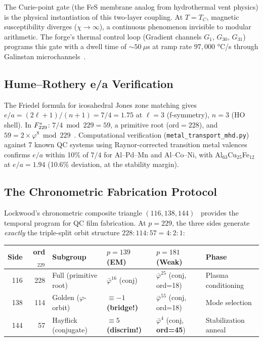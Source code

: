 The Curie-point gate (the FeS membrane analog from hydrothermal vent physics) is the physical instantiation of this two-layer coupling. At $T = T_C$, magnetic susceptibility diverges ($\chi \to \infty$), a continuous phenomenon invisible to modular arithmetic. The forge's thermal control loop (Gradient channels $G_1$, $G_{30}$, $G_{31}$) programs this gate with a dwell time of $\sim 50~\mu$s at ramp rate $97{,}000$ °C/s through Galinstan microchannels~\cite{lockwood_gmf34}.

\subsection{Hume--Rothery e/a Verification}

The Friedel formula for icosahedral Jones zone matching gives $e/a = (2\ell+1)/(n+1) = 7/4 = 1.75$ at $\ell = 3$ (f-symmetry), $n = 3$ (HO shell). In $F_{229}^*$: $7/4 \bmod 229 = 59$, a primitive root ($\mathrm{ord} = 228$), and $59 = 2 \times \varphi^8 \bmod 229$~\cite{Mizutani2017}. Computational verification (\texttt{metal\_transport\_mhd.py}) against 7 known QC systems using Raynor-corrected transition metal valences confirms $e/a$ within 10\% of $7/4$ for Al--Pd--Mn and Al--Co--Ni, with Al$_{63}$Cu$_{25}$Fe$_{12}$ at $e/a = 1.94$ (10.6\% deviation, at the stability margin).

\subsection{The Chronometric Fabrication Protocol}\label{sec:chrono}

Lockwood's chronometric composite triangle $(116, 138, 144)$~\cite{lockwood_chrono} provides the temporal program for QC film fabrication. At $p = 229$, the three sides generate \emph{exactly} the triple-split orbit structure $228{:}114{:}57 = 4{:}2{:}1$:

\begin{center}
{\small
\begin{tabular}{@{}rrllll@{}}
\toprule
\textbf{Side} & \textbf{ord$_{229}$} & \textbf{Subgroup} & \textbf{$p=139$ (EM)} & \textbf{$p=181$ (Weak)} & \textbf{Phase} \\
\midrule
116  & 228 & Full (primitive root)  & $\bar{\varphi}^{16}$ (conj) & $\bar{\varphi}^{25}$ (conj, ord=18) & Plasma conditioning \\
138  & 114 & Golden ($\varphi$-orbit) & $\equiv -1$ \textbf{(bridge!)} & $\bar{\varphi}^{55}$ (conj, ord=18) & Mode selection \\
144  &  57 & Hayflick (conjugate) & $\equiv 5$ \textbf{(discrim!)} & $\bar{\varphi}^{4}$ (conj, \textbf{ord=45}) & Stabilization anneal \\
\bottomrule
\end{tabular}
}
\end{center}

